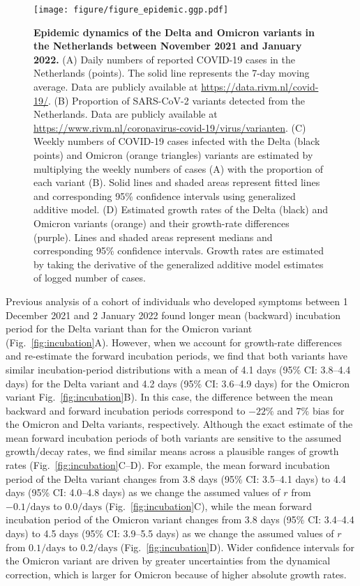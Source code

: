 \documentclass[12pt]{article}
\newcommand{\fref}[1]{Fig.~\ref{fig:#1}}
\begin{document}
\begin{figure}[!ht]
\texttt{[image: figure/figure\_epidemic.ggp.pdf]}
\caption{
\textbf{Epidemic dynamics of the Delta and Omicron variants in the Netherlands between November 2021 and January 2022.}
(A) Daily numbers of reported COVID-19 cases in the Netherlands (points).
The solid line represents the 7-day moving average.
Data are publicly available at \url{https://data.rivm.nl/covid-19/}.
(B) Proportion of SARS-CoV-2 variants detected from the Netherlands. Data are publicly available at \url{https://www.rivm.nl/coronavirus-covid-19/virus/varianten}.
(C) Weekly numbers of COVID-19 cases infected with the Delta (black points) and Omicron (orange triangles) variants are estimated by multiplying the weekly numbers of cases (A) with the proportion of each variant (B).
Solid lines and shaded areas represent fitted lines and corresponding 95\% confidence intervals using generalized additive model.
(D) Estimated growth rates of the Delta (black) and Omicron variants (orange) and their growth-rate differences (purple).
Lines and shaded areas represent medians and corresponding 95\% confidence intervals.
Growth rates are estimated by taking the derivative of the generalized additive model estimates of logged number of cases.
\label{fig:epidemic}
}
\end{figure}

Previous analysis of a cohort of individuals who developed symptoms between 1 December 2021 and 2 January 2022 found longer mean (backward) incubation period for the Delta variant than for the Omicron variant \citep{backer2021omicron} (\fref{incubation}A).
However, when we account for growth-rate differences and re-estimate the forward incubation periods, we find that both variants have similar incubation-period distributions with a mean of 4.1 days (95\% CI: 3.8--4.4 days) for the Delta variant and 4.2 days (95\% CI: 3.6--4.9 days) for the Omicron variant \fref{incubation}B).
In this case, the difference between the mean backward and forward incubation periods correspond to $-22\%$ and $7\%$ bias for the Omicron and Delta variants, respectively.
Although the exact estimate of the mean forward incubation periods of both variants are sensitive to the assumed growth/decay rates, we find similar means across a plausible ranges of growth rates (\fref{incubation}C--D).
For example, the mean forward incubation period of the Delta variant changes from 3.8 days (95\% CI: 3.5--4.1 days) to 4.4 days (95\% CI: 4.0--4.8 days) as we change the assumed values of $r$ from $-0.1/\mathrm{days}$ to $0.0/\mathrm{days}$ (\fref{incubation}C),
while the mean forward incubation period of the Omicron variant changes from 3.8 days (95\% CI: 3.4--4.4 days) to 4.5 days (95\% CI: 3.9--5.5 days) as we change the assumed values of $r$ from $0.1/\mathrm{days}$ to $0.2/\mathrm{days}$ (\fref{incubation}D).
Wider confidence intervals for the Omicron variant are driven by greater uncertainties from the dynamical correction, which is larger for Omicron because of higher absolute growth rates.
\end{document}
